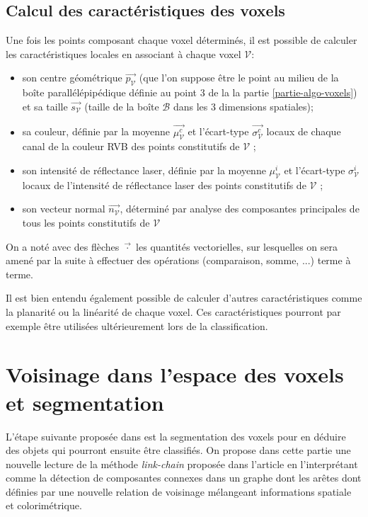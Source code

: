 \documentclass[a4paper, onecolumn, 11pt]{article}
\newcommand{\V}{\mathcal{V}}
\begin{document}
\subsection{Calcul des caractéristiques des voxels}
Une fois les points composant chaque voxel déterminés, il est possible de calculer les caractéristiques locales en associant à chaque voxel $\V$:

\begin{itemize}
\item son centre géométrique $\overrightarrow{p_\V}$ (que l'on suppose être le point au milieu de la boîte parallélépipédique définie au point 3 de la la partie \ref{partie-algo-voxels}) et sa taille $\overrightarrow{s_\V}$ (taille de la boîte $\mathcal{B}$ dans les 3 dimensions spatiales);
\item sa couleur, définie par la moyenne $\overrightarrow{\mu_\V^c}$ et l'écart-type $\overrightarrow{\sigma_\V^c}$ locaux de chaque canal de la couleur RVB des points constitutifs de $\mathcal{V}$ ;
\item son intensité de réflectance laser, définie par la moyenne $\mu_\V^i$ et l'écart-type $\sigma_\V^i$ locaux de l'intensité de réflectance laser des points constitutifs de $\mathcal{V}$ ;
\item son vecteur normal $\overrightarrow{n_\V}$, déterminé par analyse des composantes principales de tous les points constitutifs de $\mathcal{V}$
\end{itemize}

On a noté avec des flèches $\overrightarrow{\cdot}$ les quantités vectorielles, sur lesquelles on sera amené par la suite à effectuer des opérations (comparaison, somme, ...) terme à terme.

Il est bien entendu également possible de calculer d'autres caractéristiques comme la planarité ou la linéarité de chaque voxel. Ces caractéristiques pourront par exemple être utilisées ultérieurement lors de la classification.

\section{Voisinage dans l'espace des voxels et segmentation}
L'étape suivante proposée dans \cite{aka_article} est la segmentation des voxels pour en déduire des objets qui pourront ensuite être classifiés. On propose dans cette partie une nouvelle lecture de la méthode \emph{link-chain} proposée dans l'article en l'interprétant comme la détection de composantes connexes dans un graphe dont les arêtes dont définies par une nouvelle relation de voisinage mélangeant informations spatiale et colorimétrique. 
\end{document}
